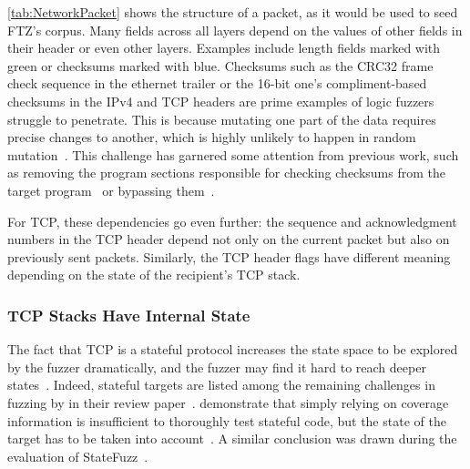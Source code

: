 \documentclass[twocolumn]{article}
\newcommand{\proj}{FTZ\xspace}
\let\savedCite=\cite
\renewcommand{\cite}{\unskip~\savedCite}
\begin{document}
\cref{tab:NetworkPacket} shows the structure of a packet, as it would be used to seed \proj's corpus. Many fields across all layers depend on the values of other fields in their header or even other layers. Examples include length fields marked with green or checksums marked with blue. Checksums such as the CRC32 frame check sequence in the ethernet trailer or the 16-bit one's compliment-based checksums in the IPv4 and TCP headers are prime examples of logic fuzzers struggle to penetrate. This is because mutating one part of the data requires precise changes to another, which is highly unlikely to happen in random mutation\cite{StateOfTheArt}. This challenge has garnered some attention from previous work, such as removing the program sections responsible for checking checksums from the target program\cite{TFuzz} or bypassing them\cite{REDQUEEN}.

For TCP, these dependencies go even further: the sequence and acknowledgment numbers in the TCP header depend not only on the current packet but also on previously sent packets. Similarly, the TCP header flags have different meaning depending on the state of the recipient's TCP stack.

\subsubsection{TCP Stacks Have Internal State}
\label{Background:TcpIsStateful}

The fact that TCP is a stateful protocol increases the state space to be explored by the fuzzer dramatically, and the fuzzer may find it hard to reach deeper states\cite{StatefulReview}. Indeed, stateful targets are listed among the remaining challenges in fuzzing by \citeauthor{ChallengesAndReflections} in their review paper\cite{ChallengesAndReflections}. \citeauthor{SGFuzz} demonstrate that simply relying on coverage information is insufficient to thoroughly test stateful code, but the state of the target has to be taken into account\cite{SGFuzz}. A similar conclusion was drawn during the evaluation of StateFuzz\cite{StateFuzz}.
\end{document}

